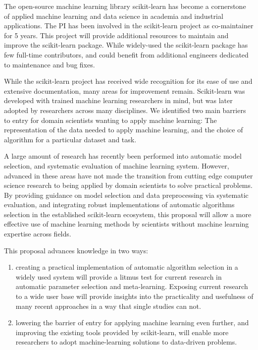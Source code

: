 The open-source machine learning library scikit-learn has become a cornerstone of
applied machine learning and data science in academia and industrial applications.
The PI has been involved in the scikit-learn project as co-maintainer for 5 years.
This project will provide additional resources to maintain and improve the
scikit-learn package.
While widely-used the scikit-learn package has few full-time contributors, and
could benefit from additional engineers dedicated to maintenance and bug fixes.

While the scikit-learn project has received wide recognition for its ease of
use and extensive documentation, many areas for improvement remain.
Scikit-learn was developed with trained machine learning researchers in mind,
but was later adopted by researchers across many disciplines.
We identified two main barriers to entry for domain scientists wanting to apply
machine learning:
The representation of the data needed to apply machine learning, and the choice
of algorithm for a particular dataset and task.

A large amount of research has recently been performed into automatic model
selection, and systematic evaluation of machine learning system.
However, advanced in these areas have not made the transition from cutting edge
computer science research to being applied by domain scientists to solve practical
problems.
By providing guidance on model selection and data preprocessing via
systematic evaluation, and integrating robust implementations of automatic
algorithms selection in the established scikit-learn ecosystem, this proposal
will allow a more effective use of machine learning methods by scientists
without machine learning expertise across fields.

This proposal advances knowledge in two ways:
\begin{enumerate}
    \item creating a practical implementation of automatic algorithm selection in a
    widely used system will provide a litmus test for current research in automatic
    parameter selection and meta-learning. Exposing current research to a wide user base
    will provide insights into the practicality and usefulness of many recent approaches
    in a way that single studies can not.
    \item lowering the barrier of entry for applying machine learning even further,
    and improving the existing tools provided by scikit-learn, will enable more
    researchers to adopt machine-learning solutions to data-driven problems.
\end{enumerate}

